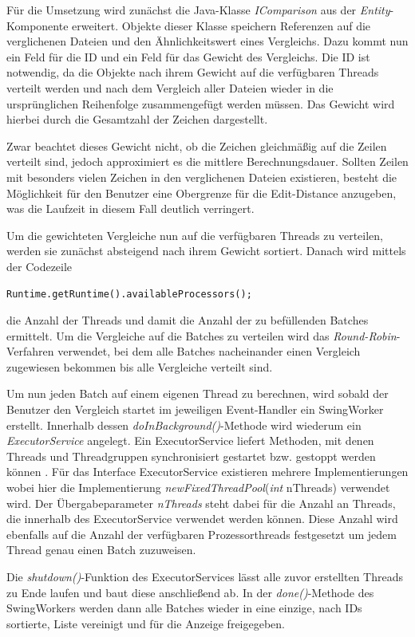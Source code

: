Für die Umsetzung wird zunächst die Java-Klasse \emph{IComparison} aus der \emph{Entity}-Komponente erweitert. Objekte dieser Klasse speichern Referenzen auf die verglichenen Dateien und den Ähnlichkeitswert eines Vergleichs. Dazu kommt nun ein Feld für die ID und ein Feld für das Gewicht des Vergleichs. Die ID ist notwendig, da die Objekte nach ihrem Gewicht auf die verfügbaren Threads verteilt werden und nach dem Vergleich aller Dateien wieder in die ursprünglichen Reihenfolge zusammengefügt werden müssen. Das Gewicht wird hierbei durch die Gesamtzahl der Zeichen dargestellt. 

Zwar beachtet dieses Gewicht nicht, ob die Zeichen gleichmäßig auf die Zeilen verteilt sind, jedoch approximiert es die mittlere Berechnungsdauer. Sollten Zeilen mit besonders vielen Zeichen in den verglichenen Dateien existieren, besteht die Möglichkeit für den Benutzer eine Obergrenze für die Edit-Distance anzugeben, was die Laufzeit in diesem Fall deutlich verringert.

Um die gewichteten Vergleiche nun auf die verfügbaren Threads zu verteilen, werden sie zunächst absteigend nach ihrem Gewicht sortiert. Danach wird mittels der Codezeile
\begin{verbatim}
Runtime.getRuntime().availableProcessors();
\end{verbatim}
die Anzahl der Threads und damit die Anzahl der zu befüllenden Batches ermittelt. Um die Vergleiche auf die Batches zu verteilen wird das \emph{Round-Robin}-Verfahren verwendet, bei dem alle Batches nacheinander einen Vergleich zugewiesen bekommen bis alle Vergleiche verteilt sind. 

Um nun jeden Batch auf einem eigenen Thread zu berechnen, wird sobald der Benutzer den Vergleich startet im jeweiligen Event-Handler ein SwingWorker erstellt. Innerhalb dessen \emph{doInBackground()}-Methode wird wiederum ein \emph{ExecutorService} angelegt. Ein ExecutorService liefert Methoden, mit denen Threads und Threadgruppen synchronisiert gestartet bzw. gestoppt werden können \autocite{executorService}. Für das Interface ExecutorService existieren mehrere Implementierungen wobei hier die Implementierung \emph{newFixedThreadPool}(\emph{int} nThreads) verwendet wird. Der Übergabeparameter \emph{nThreads} steht dabei für die Anzahl an Threads, die innerhalb des ExecutorService verwendet werden können. Diese Anzahl wird ebenfalls auf die Anzahl der verfügbaren Prozessorthreads festgesetzt um jedem Thread genau einen Batch zuzuweisen. 

Die \emph{shutdown()}-Funktion des ExecutorServices lässt alle zuvor erstellten Threads zu Ende laufen und baut diese anschließend ab. In der \emph{done()}-Methode des SwingWorkers werden dann alle Batches wieder in eine einzige, nach IDs sortierte, Liste vereinigt und für die Anzeige freigegeben.

